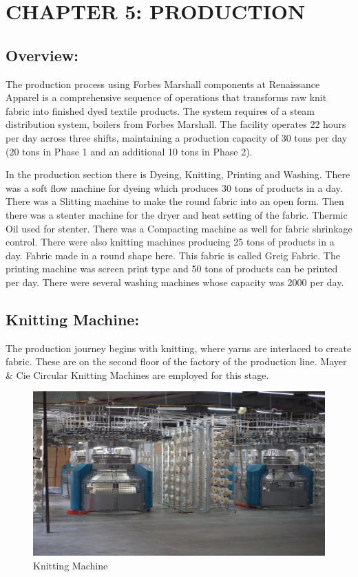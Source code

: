 \section{CHAPTER 5: PRODUCTION}

\subsection{Overview:}

The production process using Forbes Marshall components at Renaissance Apparel is 
a comprehensive sequence of operations that transforms raw knit fabric into finished dyed textile products. 
The system requires of a steam distribution system, boilers from Forbes Marshall. 
The facility operates 22 hours per day across three shifts, maintaining 
a production capacity of 30 tons per day (20 tons in Phase 1 and an additional 10 tons in Phase 2).


In the production section there is Dyeing, Knitting, Printing and Washing. There
was a soft flow machine for dyeing which produces 30 tons of products in
a day. There was a Slitting machine to make the round fabric into an
open form. Then there was a stenter machine for the dryer and heat
setting of the fabric. Thermic Oil used for stenter. There was a
Compacting machine as well for fabric shrinkage control. There were also
knitting machines producing 25 tons of products in a day. Fabric made in
a round shape here. This fabric is called Greig Fabric. The printing
machine was screen print type and 50 tons of products can be printed per
day. There were several washing machines whose capacity was 2000 per
day.\cite{knitting}

\subsection{Knitting Machine:}

The production journey begins with knitting, where yarns are interlaced to create fabric. 
These are on the second floor of the factory of the production line.
Mayer \& Cie Circular Knitting Machines are employed for this stage.

\begin{figure}[h!]
  \centering
  \includegraphics[width=0.8\linewidth]{figs/knitting.jpg}
  \caption{Knitting Machine}
  \label{fig:Knitting Machine}
\end{figure}

